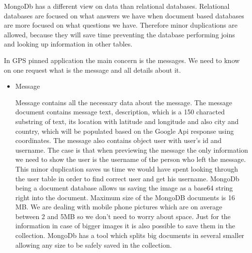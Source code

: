 \documentclass[thesis=M,english]{FITthesis}[2012/10/20]
\begin{document}
MongoDb has a different view on data than relational databases. Relational databases are focused on what answers we have when document based databases are more focused on what questions we have. Therefore minor duplications are allowed, because they will save time preventing the database performing joins and looking up information in other tables.

In GPS pinned application the main concern is the messages. We need to know on one request what is the message and all details about it. 
\begin{itemize}
\item Message

Message contains all the necessary data about the message. The message document contains message text, description, which is a 150 characted substring of text, its location with latitude and longitude and also city and country, which will be populated based on the Google Api response using coordinates. The message also contains object user with user's id and username. The case is that when previewing the message the only information we need to show the user is the username of the person who left the message. This minor duplication saves us time we would have spent looking through the user table in order to find correct user and get his username. MongoDb being a document database allows us saving the image as a base64 string right into the document. Maximum size of the MongoDB documents is 16 MB. We are dealing with mobile phone pictures which are on average between 2 and 5MB so we don't need to worry about space. %
Just for the information in case of bigger images it is also possible to save them in the collection. MongoDb has a tool which splits big documents in several smaller allowing any size to be safely saved in the collection.  %


\end{itemize}
\end{document}
